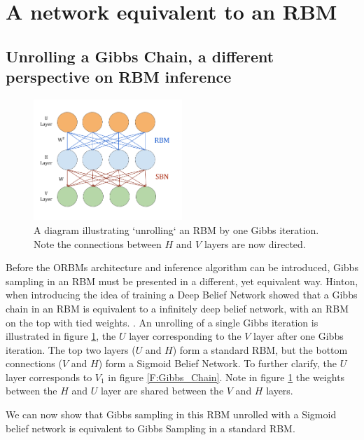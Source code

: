 
\section{A network equivalent to an RBM}

\subsection{Unrolling a Gibbs Chain, a different perspective on RBM inference}

\begin{figure}
  \begin{center}
    \includegraphics[width=0.5\textwidth]{Assets/3_Layer_RBM.png}
  \end{center}
  \caption{A diagram illustrating `unrolling` an RBM by one Gibbs iteration. Note the connections between $H$ and $V$ layers are now directed.}
  \label{F:3-Layer-RBM}
\end{figure}

Before the ORBMs architecture and inference algorithm can be introduced, Gibbs sampling in an RBM must be presented in a different, yet equivalent way.
Hinton, when introducing the idea of training a Deep Belief Network showed that a Gibbs chain in an RBM is equivalent to a infinitely deep belief network, with an RBM on the top with tied weights. . An unrolling of a single Gibbs iteration is illustrated in figure \ref{F:3-Layer-RBM}, the $U$ layer corresponding to the $V$ layer after one Gibbs iteration. The top two layers ($U$ and $H$) form a standard RBM, but the bottom connections ($V$ and $H$) form a Sigmoid Belief Network. To further clarify, the $U$ layer corresponds to $V_1$ in figure \ref{F:Gibbs_Chain}. Note in figure \ref{F:3-Layer-RBM} the weights  between the $H$ and $U$ layer are shared between the $V$ and $H$ layers.

We can now show that Gibbs sampling in this RBM unrolled with a Sigmoid belief network is equivalent to Gibbs Sampling in a standard RBM.\@

